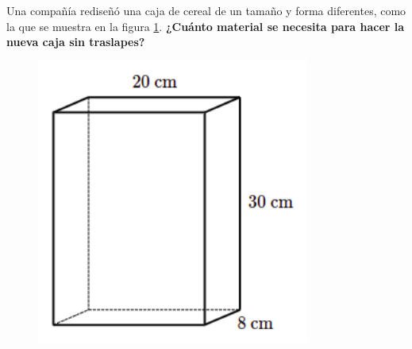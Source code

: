 Una compañía rediseñó una caja de cereal de un tamaño y forma diferentes,
como la que se muestra en la figura \ref{fig:prob_verb_superficie_04}.
\textbf{¿Cuánto material se necesita para hacer la nueva caja sin traslapes?}

\begin{minipage}{0.3\linewidth}
    \begin{figure}[H]
        \begin{center}
            \includegraphics[width=0.8\textwidth]{../images/prob_verb_superficie_04}
        \end{center}
        \caption{}
        \label{fig:prob_verb_superficie_04}
    \end{figure}
\end{minipage}
\begin{minipage}{0.7\linewidth}
    \begin{solutionbox}{6cm}
    \end{solutionbox}
\end{minipage}